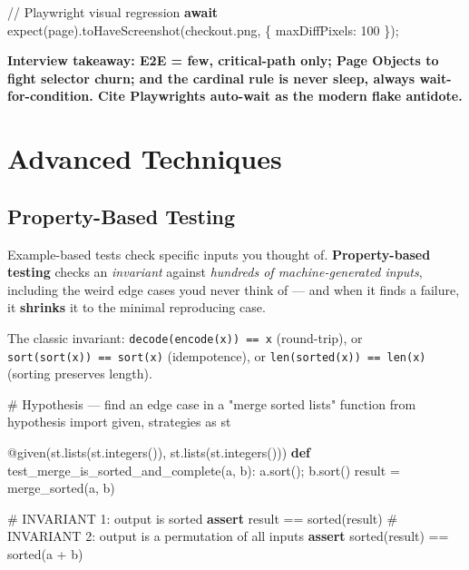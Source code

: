 \documentclass[11pt]{article}
\newenvironment{Shaded}{\begin{snugshade}}{\end{snugshade}}
\newcommand{\AttributeTok}[1]{\textcolor[rgb]{0.16,0.50,0.73}{#1}}
\newcommand{\BuiltInTok}[1]{\textcolor[rgb]{0.50,0.55,0.55}{#1}}
\newcommand{\CommentTok}[1]{\textcolor[rgb]{0.48,0.49,0.49}{#1}}
\newcommand{\ControlFlowTok}[1]{\textcolor[rgb]{0.99,0.74,0.29}{\textbf{#1}}}
\newcommand{\DataTypeTok}[1]{\textcolor[rgb]{0.16,0.50,0.73}{#1}}
\newcommand{\DecValTok}[1]{\textcolor[rgb]{0.96,0.45,0.00}{#1}}
\newcommand{\FunctionTok}[1]{\textcolor[rgb]{0.56,0.27,0.68}{#1}}
\newcommand{\ImportTok}[1]{\textcolor[rgb]{0.15,0.68,0.38}{#1}}
\newcommand{\KeywordTok}[1]{\textcolor[rgb]{0.81,0.81,0.76}{\textbf{#1}}}
\newcommand{\NormalTok}[1]{\textcolor[rgb]{0.81,0.81,0.76}{#1}}
\newcommand{\OperatorTok}[1]{\textcolor[rgb]{0.81,0.81,0.76}{#1}}
\newcommand{\StringTok}[1]{\textcolor[rgb]{0.96,0.31,0.31}{#1}}
\begin{document}

\begin{Shaded}
\begin{Highlighting}[]
\CommentTok{// Playwright visual regression}
\ControlFlowTok{await} \FunctionTok{expect}\NormalTok{(page)}\OperatorTok{.}\FunctionTok{toHaveScreenshot}\NormalTok{(}\StringTok{\textquotesingle{}checkout.png\textquotesingle{}}\OperatorTok{,}\NormalTok{ \{ }\DataTypeTok{maxDiffPixels}\OperatorTok{:} \DecValTok{100}\NormalTok{ \})}\OperatorTok{;}
\end{Highlighting}
\end{Shaded}

\textbf{Interview takeaway: E2E = few, critical-path only; Page Objects to fight selector churn; and the cardinal rule is never sleep, always wait-for-condition. Cite Playwright\textquotesingle s auto-wait as the modern flake antidote.}

\section{Advanced Techniques}\label{advanced-techniques}

\subsection{Property-Based Testing}\label{property-based-testing}

Example-based tests check specific inputs you thought of. \textbf{Property-based testing} checks an \emph{invariant} against \emph{hundreds of machine-generated inputs}, including the weird edge cases you\textquotesingle d never think of --- and when it finds a failure, it \textbf{shrinks} it to the minimal reproducing case.

The classic invariant: \texttt{decode(encode(x))\ ==\ x} (round-trip), or \texttt{sort(sort(x))\ ==\ sort(x)} (idempotence), or \texttt{len(sorted(x))\ ==\ len(x)} (sorting preserves length).


\begin{Shaded}
\begin{Highlighting}[]
\CommentTok{\# Hypothesis — find an edge case in a "merge sorted lists" function}
\ImportTok{from}\NormalTok{ hypothesis }\ImportTok{import}\NormalTok{ given, strategies }\ImportTok{as}\NormalTok{ st}

\AttributeTok{@given}\NormalTok{(st.lists(st.integers()), st.lists(st.integers()))}
\KeywordTok{def}\NormalTok{ test\_merge\_is\_sorted\_and\_complete(a, b):}
\NormalTok{    a.sort()}\OperatorTok{;}\NormalTok{ b.sort()}
\NormalTok{    result }\OperatorTok{=}\NormalTok{ merge\_sorted(a, b)}

    \CommentTok{\# INVARIANT 1: output is sorted}
    \ControlFlowTok{assert}\NormalTok{ result }\OperatorTok{==} \BuiltInTok{sorted}\NormalTok{(result)}
    \CommentTok{\# INVARIANT 2: output is a permutation of all inputs}
    \ControlFlowTok{assert} \BuiltInTok{sorted}\NormalTok{(result) }\OperatorTok{==} \BuiltInTok{sorted}\NormalTok{(a }\OperatorTok{+}\NormalTok{ b)}
\end{Highlighting}
\end{Shaded}
\end{document}
